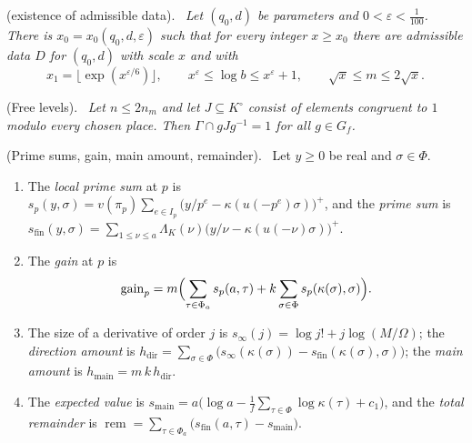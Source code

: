 \documentclass[10pt]{amsart}
\theoremstyle{definition}
\theoremstyle{remark}
\providecommand{\auPa}{\Phi_a}
\providecommand{\auPl}{\Phi}
\providecommand{\augain}{\operatorname{gain}}
\providecommand{\auhdir}{h_{\mathrm{dir}}}
\providecommand{\auhmain}{h_{\mathrm{main}}}
\providecommand{\aurem}{\operatorname{rem}}
\providecommand{\ausfin}{s_{\mathrm{fin}}}
\providecommand{\ausinf}{s_\infty}
\providecommand{\ausmain}{s_{\mathrm{main}}}
\newenvironment{quotedthm}[2]{\par\medskip\noindent\begingroup
  \textbf{#1}#2.\ \itshape\ignorespaces}{\endgroup\par\medskip}
\newenvironment{quoteddef}[2]{\par\medskip\noindent\begingroup
  \textbf{#1}#2.\ \ignorespaces}{\endgroup\par\medskip}
\begin{document}
\begin{quotedthm}{\cite[Theorem~13.9]{P46}}{ (existence of admissible data)}
Let $(q_0,d)$ be parameters and $0<\varepsilon<\frac1{100}$. There is
$x_0=x_0(q_0,d,\varepsilon)$ such that for every integer $x\ge x_0$ there are
admissible data $D$ for $(q_0,d)$ with scale $x$ and with
\[
 x_1=\bigl\lfloor\exp(x^{\varepsilon/6})\bigr\rfloor,\qquad x^{\varepsilon}\le\log b\le x^{\varepsilon}+1,\qquad\sqrt x\le m\le2\sqrt x .
\]
\end{quotedthm}

\begin{quotedthm}{\cite[Lemma~14.5]{P46}}{ (Free levels)}
Let $n\le2n_m$ and let $J\subseteq K^\circ$ consist of elements congruent to $1$ modulo every
chosen place. Then $\Gamma\cap gJg^{-1}=1$ for all $g\in G_f$.
\end{quotedthm}

\begin{quoteddef}{\cite[Definition~14.8]{P46}}{ (Prime sums, gain, main amount, remainder)}
Let $y\ge0$ be real and $\sigma\in\auPl$.
\begin{enumerate}
\item[(a)] The \emph{local prime sum} at $p$ is
$s_p(y,\sigma)=v(\pi_p)\sum_{e\in I_p}\bigl(y/p^e-\kappa(u(-p^e)\sigma)\bigr)^+$, and the
\emph{prime sum} is
$\ausfin(y,\sigma)=\sum_{1\le\nu\le a}\Lambda_K(\nu)\bigl(y/\nu-\kappa(u(-\nu)\sigma)\bigr)^+$.
\item[(b)] The \emph{gain} at $p$ is
\[
\augain_p=m\Bigl(\sum_{\tau\in\auPa}s_p(a,\tau)+k\sum_{\sigma\in\auPl}s_p(\kappa(\sigma),\sigma)
\Bigr).
\]
\item[(c)] The size of a derivative of order $j$ is $\ausinf(j)=\log j!+j\log(M/\Omega)$; the
\emph{direction amount} is $\auhdir=\sum_{\sigma\in\auPl}\bigl(\ausinf(\kappa(\sigma))-
\ausfin(\kappa(\sigma),\sigma)\bigr)$; the \emph{main amount} is $\auhmain=m\,k\,\auhdir$.
\item[(d)] The \emph{expected value} is
$\ausmain=a\bigl(\log a-\tfrac1f\sum_{\tau\in\auPl}\log\kappa(\tau)+c_1\bigr)$, and the
\emph{total remainder} is $\aurem=\sum_{\tau\in\auPa}\bigl(\ausfin(a,\tau)-\ausmain\bigr)$.
\end{enumerate}
\end{quoteddef}
\end{document}
